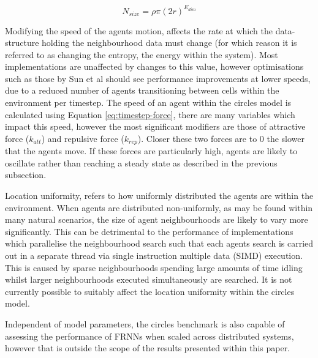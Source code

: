     \begin{equation}\label{eq:neighbourhood-size}
        N_{size} = \rho \pi (2r)^{E_{dim}}
    \end{equation}
      
    Modifying the speed of the agents motion, affects the rate at which the data-structure holding the neighbourhood data must change (for which reason it is referred to as changing the entropy, the energy within the system). Most implementations are unaffected by changes to this value, however optimisations such as those by Sun et al\cite{HY*15} should see performance improvements at lower speeds, due to a reduced number of agents transitioning between cells within the environment per timestep. The speed of an agent within the circles model is calculated using Equation \ref{eq:timestep-force}, there are many variables which impact this speed, however the most significant modifiers are those of attractive force ($k_{att}$) and repulsive force ($k_{rep}$). Closer these two forces are to $0$ the slower that the agents move. If these forces are particularly high, agents are likely to oscillate rather than reaching a steady state as described in the previous subsection.
    
    Location uniformity, refers to how uniformly distributed the agents are within the environment. When agents are distributed non-uniformly, as may be found within many natural scenarios, the size of agent neighbourhoods are likely to vary more significantly. This can be detrimental to the performance of implementations which parallelise the neighbourhood search such that each agents search is carried out in a separate thread via single instruction multiple data (SIMD) execution. This is caused by sparse neighbourhoods spending large amounts of time idling whilst larger neighbourhoods executed simultaneously are searched. It is not currently possible to suitably affect the location uniformity within the circles model.
    
    Independent of model parameters, the circles benchmark is also capable of assessing the performance of FRNNs when scaled across distributed systems, however that is outside the scope of the results presented within this paper.